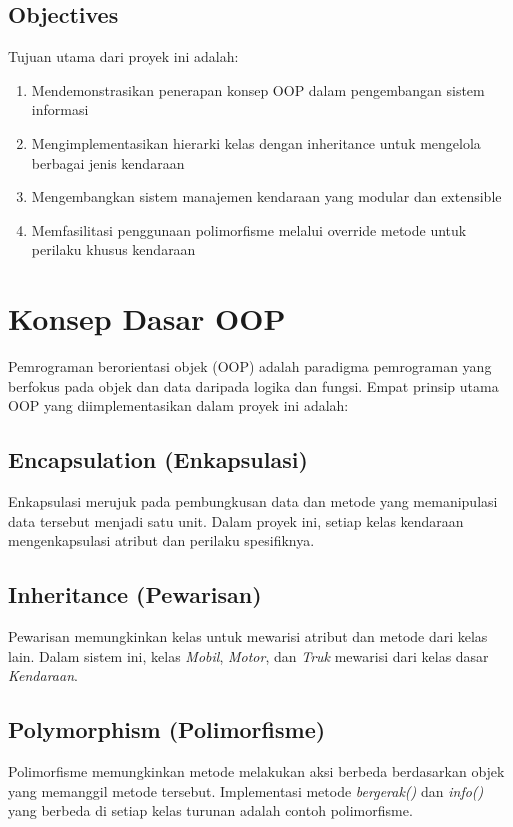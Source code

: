 \documentclass[12pt]{article}
\begin{document}
\subsection{Objectives}
Tujuan utama dari proyek ini adalah:
\begin{enumerate}
    \item Mendemonstrasikan penerapan konsep OOP dalam pengembangan sistem informasi
    \item Mengimplementasikan hierarki kelas dengan inheritance untuk mengelola berbagai jenis kendaraan
    \item Mengembangkan sistem manajemen kendaraan yang modular dan extensible
    \item Memfasilitasi penggunaan polimorfisme melalui override metode untuk perilaku khusus kendaraan
\end{enumerate}

\section{Konsep Dasar OOP}
Pemrograman berorientasi objek (OOP) adalah paradigma pemrograman yang berfokus pada objek dan data daripada logika dan fungsi. Empat prinsip utama OOP yang diimplementasikan dalam proyek ini adalah:

\subsection{Encapsulation (Enkapsulasi)}
Enkapsulasi merujuk pada pembungkusan data dan metode yang memanipulasi data tersebut menjadi satu unit. Dalam proyek ini, setiap kelas kendaraan mengenkapsulasi atribut dan perilaku spesifiknya.

\subsection{Inheritance (Pewarisan)}
Pewarisan memungkinkan kelas untuk mewarisi atribut dan metode dari kelas lain. Dalam sistem ini, kelas \textit{Mobil}, \textit{Motor}, dan \textit{Truk} mewarisi dari kelas dasar \textit{Kendaraan}.

\subsection{Polymorphism (Polimorfisme)}
Polimorfisme memungkinkan metode melakukan aksi berbeda berdasarkan objek yang memanggil metode tersebut. Implementasi metode \textit{bergerak()} dan \textit{info()} yang berbeda di setiap kelas turunan adalah contoh polimorfisme.
\end{document}

